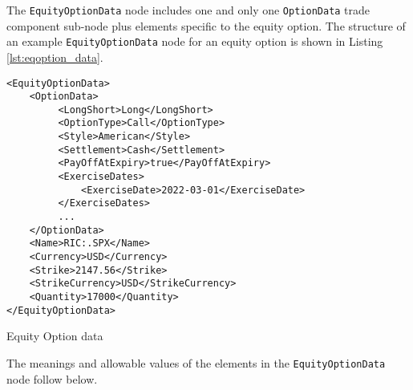 The \lstinline!EquityOptionData!  node includes one and 
only one \lstinline!OptionData! trade component sub-node plus elements specific to the equity option. The structure of 
an example \lstinline!EquityOptionData! node for an equity option is shown in Listing
\ref{lst:eqoption_data}.

\begin{listing}[H]
\begin{verbatim}
<EquityOptionData>
    <OptionData>
         <LongShort>Long</LongShort>
         <OptionType>Call</OptionType>
         <Style>American</Style>
         <Settlement>Cash</Settlement>
         <PayOffAtExpiry>true</PayOffAtExpiry>
         <ExerciseDates>
             <ExerciseDate>2022-03-01</ExerciseDate>
         </ExerciseDates>
         ...
    </OptionData>
    <Name>RIC:.SPX</Name>
    <Currency>USD</Currency>
    <Strike>2147.56</Strike>
    <StrikeCurrency>USD</StrikeCurrency>
    <Quantity>17000</Quantity>
</EquityOptionData>
\end{verbatim}
\caption{Equity Option data}
\label{lst:eqoption_data}
\end{listing}

The meanings and allowable values of the elements in the \lstinline!EquityOptionData! node follow below.

